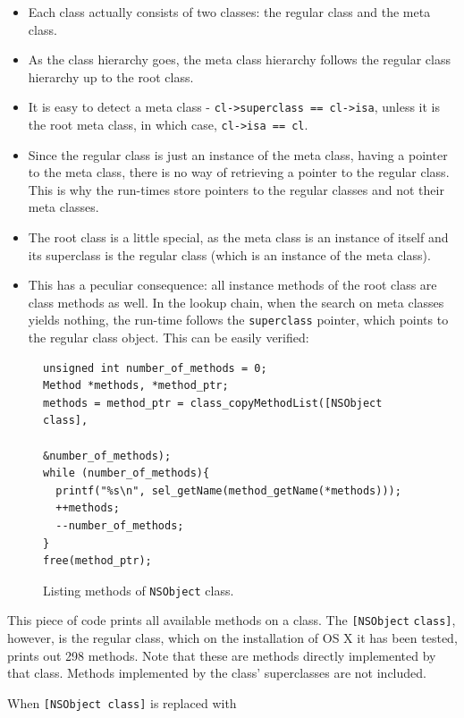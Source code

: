 \begin{itemize}
\item Each class actually consists of two classes: the regular class and the meta class.
\item As the class hierarchy goes, the meta class hierarchy follows the regular class hierarchy up to the root class.
\item It is easy to detect a meta class - \verb:cl->superclass == cl->isa:, unless it is the root meta class, in which case, \verb:cl->isa == cl:.
\item Since the regular class is just an instance of the meta class, having a pointer to the meta class, there is no way of retrieving a pointer to the regular class. This is why the run-times store pointers to the regular classes and not their meta classes.
\item The root class is a little special, as the meta class is an instance of itself and its superclass is the regular class (which is an instance of the meta class).
\item This has a peculiar consequence: all instance methods of the root class are class methods as well. In the lookup chain, when the search on meta classes yields nothing, the run-time follows the \verb=superclass= pointer, which points to the regular class object. This can be easily verified:
\end{itemize}

\begin{figure}[H]
\begin{verbatim}
unsigned int number_of_methods = 0;
Method *methods, *method_ptr;
methods = method_ptr = class_copyMethodList([NSObject class], 
                                            &number_of_methods);
while (number_of_methods){
  printf("%s\n", sel_getName(method_getName(*methods)));
  ++methods;
  --number_of_methods;
}
free(method_ptr);
\end{verbatim}
  \centering{}
  \caption{Listing methods of \texttt{NSObject} class.}
  \label{fig:listing_NSObject_methods}
\end{figure}

This piece of code prints all available methods on a class. The \verb=[NSObject= \verb=class]=, however, is the regular class, which on the installation of OS X it has been tested, prints out 298 methods. Note that these are methods directly implemented by that class. Methods implemented by the class' superclasses are not included.

When \verb=[NSObject class]= is replaced with

